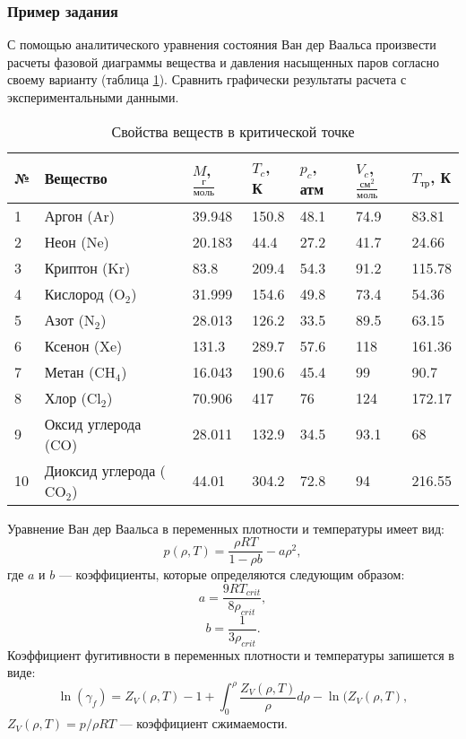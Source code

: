 \subsubsection*{Пример задания}
С помощью аналитического уравнения состояния Ван дер Ваальса произвести расчеты фазовой диаграммы вещества и давления насыщенных паров согласно своему варианту (таблица \ref{tab:eos.task}). Сравнить графически результаты расчета с экспериментальными данными.
\begin{table}[ht]
	\caption{Свойства веществ в критической точке}
	\label{tab:eos.task}
	\begin{tabularx}{\textwidth}%
		{|p{}
			|p{}
			|X
			|X
			|X
			|X
			|X|
		}
		\hline
		№  & Вещество  & $M$, $\frac{г}{моль}$  & $T_{c}$, К  & $p_{c}$, атм  & $V_{c}$, ${\frac{см^2}{моль}}$ & $T_{тр}$, К  \\ \hline \hline
		1 & Аргон (Ar)  & 39.948  & 150.8 & 48.1 & 74.9 & 83.81 \\ \hline
		2 & Неон (Ne) & 20.183 & 44.4 & 27.2 & 41.7 & 24.66 \\ \hline
		3 & Криптон (Kr) & 83.8 & 209.4 & 54.3 & 91.2 & 115.78 \\ \hline
		4 & Кислород ($\mathrm{O_2}$) & 31.999 & 154.6 & 49.8 & 73.4 & 54.36\\ \hline
		5 & Азот ($\mathrm{N_2}$) & 28.013 & 126.2 & 33.5 & 89.5 & 63.15 \\ \hline
		6 & Ксенон (Xe) & 131.3 & 289.7 & 57.6 & 118 & 161.36 \\ \hline
		7 & Метан ($\mathrm{CH_4}$) & 16.043 & 190.6 & 45.4 & 99 & 90.7 \\ \hline
		8 & Хлор ($\mathrm{Cl_2}$) & 70.906 & 417 & 76 & 124 & 172.17 \\ \hline
		9 & Оксид углерода (CO) & 28.011 & 132.9 & 34.5 & 93.1 & 68 \\ \hline
		10 & Диоксид углерода ($\mathrm{CO_2}$) &44.01 & 304.2 & 72.8 & 94 &	216.55 \\ \hline
	\end{tabularx}
\end{table}

Уравнение Ван дер Ваальса в переменных плотности и температуры имеет вид:
\begin{equation*}
p(\rho,T)=\dfrac{\rho R T}{1-\rho b} - a \rho^2,
\end{equation*}
где $a$ и $b$ --- коэффициенты, которые определяются следующим образом:
\begin{equation*}
a=\dfrac{9 R T_{crit}}{8 \rho_{crit}},
\end{equation*}
\begin{equation*}
b=\dfrac{1}{3 \rho_{crit}}.
\end{equation*}
Коэффициент фугитивности в переменных плотности и температуры запишется в виде:
\begin{equation*}
\ln(\gamma_f)=Z_V(\rho,T)-1+\int_{0}^{\rho} \dfrac{Z_V(\rho,T)}{\rho} d\rho -\ln(Z_V(\rho,T),
\end{equation*}
$Z_V(\rho,T)=p/{\rho R T}$ --- коэффициент сжимаемости.
